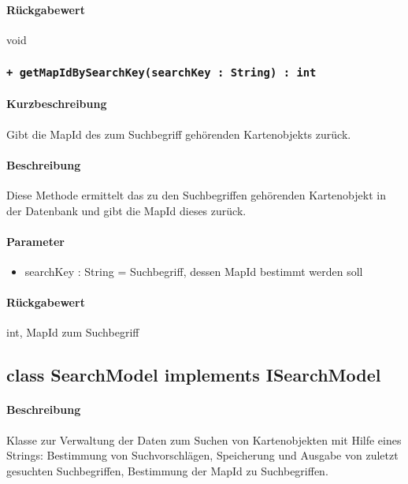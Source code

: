 \paragraph*{Rückgabewert}
void

\subsubsection{\texttt{+ getMapIdBySearchKey(searchKey : String) : int}}%
\paragraph*{Kurzbeschreibung}
Gibt die MapId des zum Suchbegriff gehörenden Kartenobjekts zurück.
\paragraph*{Beschreibung}
Diese Methode ermittelt das zu den Suchbegriffen gehörenden Kartenobjekt in der Datenbank und gibt die MapId dieses zurück.
\paragraph*{Parameter}
\begin{itemize}
    \item searchKey : String = Suchbegriff, dessen MapId bestimmt werden soll
\end{itemize}
\paragraph*{Rückgabewert}
int, MapId zum Suchbegriff


\subsection{class SearchModel implements ISearchModel}
\paragraph*{Beschreibung}
Klasse zur Verwaltung der Daten zum Suchen von Kartenobjekten mit Hilfe eines Strings: 
Bestimmung von Suchvorschlägen, Speicherung und Ausgabe von zuletzt gesuchten Suchbegriffen, Bestimmung der MapId zu Suchbegriffen.